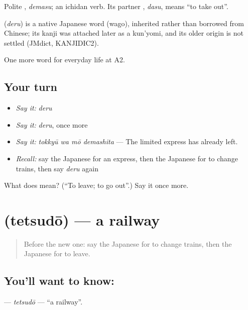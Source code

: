 Polite \textbf{}, \emph{demasu}; an ichidan verb. Its partner \textbf{}, \emph{dasu}, means \textquotedblleft{}to take out\textquotedblright{}.

\begin{cousinweb}
\textbf{} (\emph{deru}) is a native Japanese word (wago), inherited rather than borrowed from Chinese; its kanji was attached later as a kun'yomi, and its older origin is not settled (JMdict, KANJIDIC2).
\end{cousinweb}

\begin{grammarlens}[title={What you've built}]
One more word for everyday life at A2.
\end{grammarlens}

\subsection*{Your turn}
\begin{itemize}
\raggedright
  \item \emph{Say it:} \emph{deru}
  \item \emph{Say it:} \emph{deru}, once more
  \item \emph{Say it:} \emph{tokkyū wa mō demashita} — The limited express has already left.
  \item \emph{Recall:} say the Japanese for an express, then the Japanese for to change trains, then say \emph{deru} again
\end{itemize}

\begin{tcolorbox}[breakable,colback=teal!4,colframe=teal!35!black,title={Before you move on}]
What does  mean? (\textquotedblleft{}To leave; to go out\textquotedblright{}.) Say it once more.
\end{tcolorbox}
\section[\texorpdfstring{\ja{てつどう} (tetsudō)}{てつどう (tetsudō)}]{ (tetsudō) — a railway}

\label{lesson:JA-C200-tetsudou}



\begin{quote}
Before the new one: say the Japanese for to change trains, then the Japanese for to leave.
\end{quote}

\subsection*{You'll want to know: }
\textbf{} — \emph{tetsudō} — \textquotedblleft{}a railway\textquotedblright{}.


